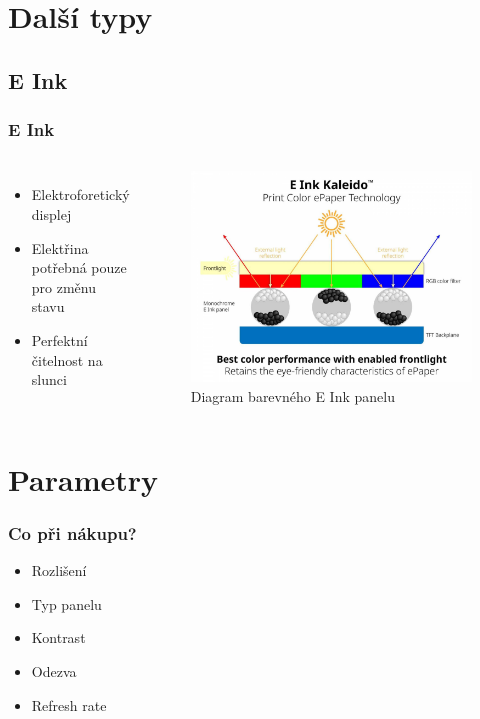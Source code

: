 \documentclass[aspectratio=169,11pt, allowframebreak=0.9]{beamer}
\begin{document}
    \section{Další typy}
    \subsection{E Ink}
    \begin{frame}
    \frametitle{E Ink}
    \begin{columns}
    \begin{itemize}
        \item Elektroforetický displej
        \item Elektřina potřebná pouze pro změnu stavu
        \item Perfektní čitelnost na slunci
    \end{itemize}
    \begin{figure}
        \centering
        \includegraphics[width=1\textwidth]{eink}
        \caption{Diagram barevného E Ink panelu}
    \end{figure}
    \end{columns}
    \end{frame}
    \section{Parametry}
    \begin{frame}
        \frametitle{Co při nákupu?}
        \begin{itemize}
            \item Rozlišení
            \item Typ panelu
            \item Kontrast
            \item Odezva
            \item Refresh rate
        \end{itemize}
        
        \end{frame}
\end{document}
